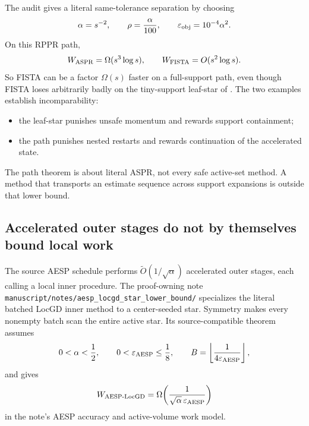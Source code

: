 The audit gives a literal same-tolerance separation by choosing
\begin{equation}
  \alpha=s^{-2},
  \qquad
  \rho=\frac\alpha{100},
  \qquad
  \varepsilon_{\rm obj}=10^{-4}\alpha^2.
  \label{eq:signed-star-aspr-quantitative-family}
\end{equation}
On this RPPR path,
\begin{equation}
  W_{\rm ASPR}=\Omega(s^3\log s),
  \qquad
  W_{\rm FISTA}=O(s^2\log s).
  \label{eq:signed-star-aspr-fista-separation}
\end{equation}
So FISTA can be a factor $\Omega(s)$ faster on a full-support path, even
though FISTA loses arbitrarily badly on the tiny-support leaf-star of
.  The two examples establish
incomparability:
\begin{itemize}[leftmargin=*]
\item the leaf-star punishes unsafe momentum and rewards support containment;
\item the path punishes nested restarts and rewards continuation of the
      accelerated state.
\end{itemize}
The path theorem is about literal ASPR, not every safe active-set method.  A
method that transports an estimate sequence across support expansions is
outside that lower bound.

\subsection{Accelerated outer stages do not by themselves bound local work}

The source AESP schedule performs $\widetilde O(1/\sqrt\alpha)$ accelerated
outer stages, each calling a local inner procedure.  The proof-owning note
\texttt{manuscript/notes/aesp\_locgd\_star\_lower\_bound/} specializes the
literal batched LocGD inner method to a center-seeded star.  Symmetry makes
every nonempty batch scan the entire active star.  Its source-compatible
theorem assumes
\begin{equation*}
 0<\alpha<\frac12,
 \qquad 0<\varepsilon_{\rm AESP}\leq\frac18,
 \qquad B=\left\lfloor\frac1{4\varepsilon_{\rm AESP}}\right\rfloor,
\end{equation*}
and gives
\begin{equation}
  W_{\rm AESP\text{-}LocGD}
  =\Omega\!\left(
      \frac{1}{\sqrt\alpha\,\varepsilon_{\rm AESP}}
    \right)
  \label{eq:signed-star-aesp-locgd-lower}
\end{equation}
in the note's AESP accuracy and active-volume work model.


